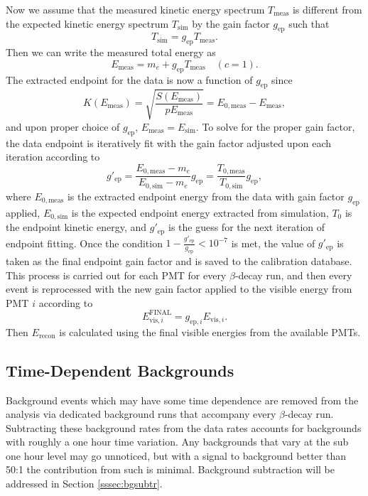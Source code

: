 Now we assume that the measured kinetic energy spectrum $T_{\mathrm{meas}}$ is different from the expected
kinetic energy spectrum $T_{\mathrm{sim}}$ by the gain factor $g_{\mathrm{ep}}$ such that
%
\begin{equation}
  T_{\mathrm{sim}} = g_{\mathrm{ep}} T_{\mathrm{meas}}.
\end{equation}
Then we can write the
measured total energy as
\begin{equation}
  E_{\mathrm{meas}} = m_e + g_{\mathrm{ep}}T_{\mathrm{meas}} \quad (c=1).
\end{equation}
The extracted endpoint for the data is now a function of $g_{\mathrm{ep}}$
since
\begin{equation}
  K(E_{\mathrm{meas}}) = \sqrt{\frac{S(E_{\mathrm{meas}})}{pE_{\mathrm{meas}}}} = E_{0,\mathrm{meas}}-E_{\mathrm{meas}},
\end{equation}
and upon proper choice of $g_{\mathrm{ep}}$, $E_{\mathrm{meas}}=E_{\mathrm{sim}}$. To solve for
the proper gain factor, the data endpoint is iteratively fit with the gain factor adjusted upon each iteration
according to
%
\begin{equation}
  g'_{\mathrm{ep}} = \frac{ E_{0,\mathrm{meas}}- m_e}{ E_{0,\mathrm{sim}}- m_e}g_{\mathrm{ep}} =  \frac{ T_{0,\mathrm{meas}}}{ T_{0,\mathrm{sim}}}g_{\mathrm{ep}}, 
\end{equation}
%
where $E_{0,\mathrm{meas}}$ is the extracted endpoint energy from the data with gain factor $g_{\mathrm{ep}}$ applied,
$E_{0,\mathrm{sim}}$ is the expected endpoint energy extracted from simulation, $T_0$ is the endpoint kinetic energy,
and $g'_{\mathrm{ep}}$ is the guess for the next iteration of endpoint fitting.
Once the condition $1-\frac{g'_{\mathrm{ep}}}{g_{\mathrm{ep}}}<10^{-7}$ is met, the value of $g'_{\mathrm{ep}}$ is taken as the final
endpoint gain factor and is saved to the calibration database. This process is carried out for each PMT for every
$\beta$-decay run, and then every event is reprocessed with the new gain factor applied to the visible energy from PMT
$i$ according to
%
\begin{equation}
  E_{\mathrm{vis},i}^{\mathrm{FINAL}} = g_{\mathrm{ep},i} E_{\mathrm{vis},i}.
\end{equation}
Then $E_{\mathrm{recon}}$ is calculated using the final visible energies from the available PMTs.



\subsection{Time-Dependent Backgrounds}
Background events which may have some time dependence are removed from the analysis
via dedicated background runs that accompany every $\beta$-decay run.
Subtracting these background rates from the data rates accounts for backgrounds
with roughly a one hour time variation.
Any backgrounds that vary at the sub one hour level may go unnoticed, but
with a signal to background better than 50:1 the contribution from such is minimal.
Background subtraction will be addressed in Section \ref{sssec:bgsubtr}. 

